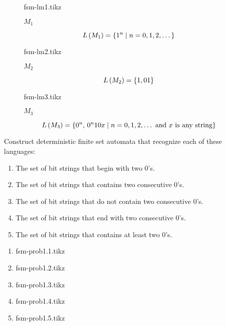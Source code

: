 \documentclass[../main-sheet.tex]{subfiles}
\begin{document}
\begin{figure}[H]
    \centering
    {fsm-lm1.tikz}
    \caption{$ M_1 $}
\end{figure}
\[L\left( M_1 \right)=\left\{1^n\mid n=0,1,2,\dots\right\}\]
\begin{figure}[H]
    \centering
    {fsm-lm2.tikz}
    \caption{$ M_2 $}
\end{figure}
\[L\left( M_2 \right)=\left\{1,01\right\}\]
\begin{figure}[H]
    \centering
    {fsm-lm3.tikz}
    \caption{$ M_3 $}
\end{figure}
\[L\left( M_3 \right)=\left\{0^n,\,0^n10x\mid n=0,1,2,\dots \text{ and $ x $ is any string}\right\}\]
\begin{prob}
    Construct deterministic finite set automata that recognize each of these languages:
    \begin{enumerate}[label=(\alph*)]
        \item The set of bit strings that begin with two $ 0 $'s.
        \item The set of bit strings that contains two consecutive $ 0 $'s.
        \item The set of bit strings that do not contain two consecutive $ 0 $'s.
        \item The set of bit strings that end with two consecutive $ 0 $'s.
        \item The set of bit strings that contains at least two $ 0 $'s.
    \end{enumerate}
\end{prob}
\begin{soln}\hfill
    \begin{enumerate}[label=(\alph*)]
        \item \begin{minipage}[c]{.9\textwidth}
            \centering
            {fsm-prob1.1.tikz}
        \end{minipage}
        \item \begin{minipage}[c]{.9\textwidth}
            \centering
            {fsm-prob1.2.tikz}
        \end{minipage}
        \item \begin{minipage}[c]{.9\textwidth}
            \centering
            {fsm-prob1.3.tikz}
        \end{minipage}
        \item \begin{minipage}[c]{.9\textwidth}
            \centering
            {fsm-prob1.4.tikz}
        \end{minipage}
        \item \begin{minipage}[c]{.9\textwidth}
            \centering
            {fsm-prob1.5.tikz}
        \end{minipage}
    \end{enumerate}
\end{soln}
\end{document}
